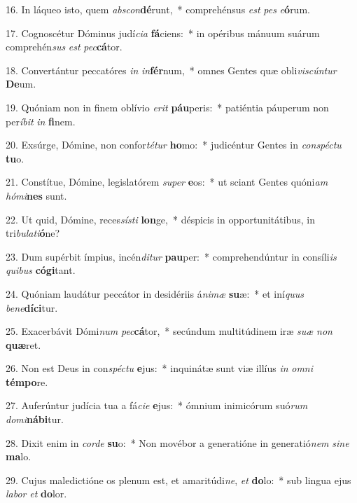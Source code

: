 16. In láqueo isto, quem \textit{abs}\textit{con}\textbf{dé}runt,~*  comprehénsus \textit{est} \textit{pes} \textit{e}\textbf{ó}rum.\

17. Cognoscétur Dóminus judí\textit{ci}\textit{a} \textbf{fá}ciens:~*  in opéribus mánuum suárum comprehén\textit{sus} \textit{est} \textit{pec}\textbf{cá}tor.\

18. Convertántur peccatóres \textit{in} \textit{in}\textbf{fér}num,~*  omnes Gentes quæ obli\textit{vis}\textit{cún}\textit{tur} \textbf{De}um.\

19. Quóniam non in finem oblívio \textit{e}\textit{rit} \textbf{páu}peris:~*  patiéntia páuperum non per\textit{í}\textit{bit} \textit{in} \textbf{fi}nem.\

20. Exsúrge, Dómine, non confor\textit{té}\textit{tur} \textbf{ho}mo:~*  judicéntur Gentes in \textit{con}\textit{spéc}\textit{tu} \textbf{tu}o.\

21. Constítue, Dómine, legislatórem \textit{su}\textit{per} \textbf{e}os:~*  ut sciant Gentes quóni\textit{am} \textit{hó}\textit{mi}\textbf{nes} sunt.\

22. Ut quid, Dómine, reces\textit{sís}\textit{ti} \textbf{lon}ge,~*  déspicis in opportunitátibus, in tri\textit{bu}\textit{la}\textit{ti}\textbf{ó}ne?\

23. Dum supérbit ímpius, incén\textit{di}\textit{tur} \textbf{pau}per:~*  comprehendúntur in consíli\textit{is} \textit{qui}\textit{bus} \textbf{có}\textbf{gi}tant.\

24. Quóniam laudátur peccátor in desidériis á\textit{ni}\textit{mæ} \textbf{su}æ:~*  et iní\textit{quus} \textit{be}\textit{ne}\textbf{dí}\textbf{ci}tur.\

25. Exacerbávit Dómi\textit{num} \textit{pec}\textbf{cá}tor,~*  secúndum multitúdinem iræ \textit{su}\textit{æ} \textit{non} \textbf{quæ}ret.\

26. Non est Deus in con\textit{spéc}\textit{tu} \textbf{e}jus:~*  inquinátæ sunt viæ illíus \textit{in} \textit{om}\textit{ni} \textbf{tém}\textbf{po}re.\

27. Auferúntur judícia tua a fá\textit{ci}\textit{e} \textbf{e}jus:~*  ómnium inimicórum suó\textit{rum} \textit{do}\textit{mi}\textbf{ná}\textbf{bi}tur.\

28. Dixit enim in \textit{cor}\textit{de} \textbf{su}o:~*  Non movébor a generatióne in generatió\textit{nem} \textit{si}\textit{ne} \textbf{ma}lo.\

29. Cujus maledictióne os plenum est, et amaritúdi\textit{ne}, \textit{et} \textbf{do}lo:~*  sub lingua ejus \textit{la}\textit{bor} \textit{et} \textbf{do}lor.\


